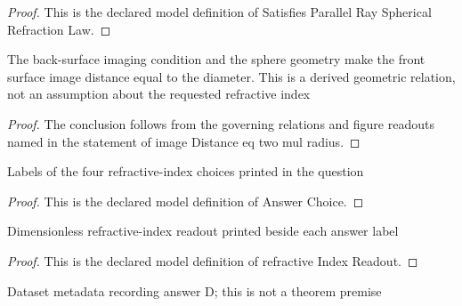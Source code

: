 \begin{proof}
  This is the declared model definition of Satisfies Parallel Ray Spherical Refraction Law.
\end{proof}
\begin{lemma}
  \label{lem:physics:phyx-mini-0477:phyxminiproblems-problemphyxmini0477-imagedistance-eq-two-mul-radius}
  The back-surface imaging condition and the sphere geometry make the front surface image distance equal to the diameter. This is a derived geometric relation, not an assumption about the requested refractive index
\end{lemma}
\begin{proof}
  The conclusion follows from the governing relations and figure readouts named in the statement of image Distance eq two mul radius.
\end{proof}
\begin{definition}
  \label{def:physics:phyx-mini-0477:phyxminiproblems-problemphyxmini0477-answerchoice}
  Labels of the four refractive-index choices printed in the question
\end{definition}
\begin{proof}
  This is the declared model definition of Answer Choice.
\end{proof}
\begin{definition}
  \label{def:physics:phyx-mini-0477:phyxminiproblems-problemphyxmini0477-answerchoice-refractiveindexreadout}
  Dimensionless refractive-index readout printed beside each answer label
\end{definition}
\begin{proof}
  This is the declared model definition of refractive Index Readout.
\end{proof}
\begin{definition}
  \label{def:physics:phyx-mini-0477:phyxminiproblems-problemphyxmini0477-recordedanswerchoice}
  Dataset metadata recording answer D; this is not a theorem premise
\end{definition}
